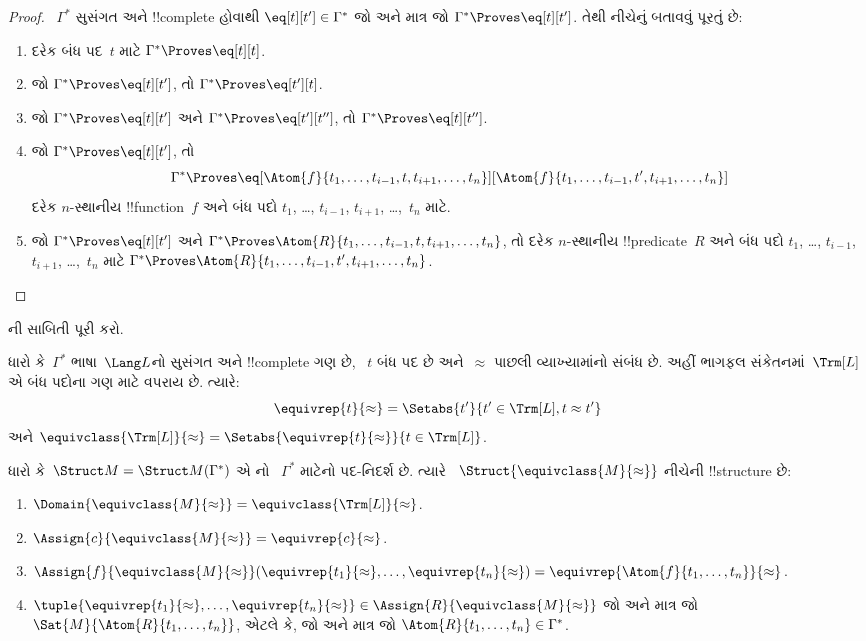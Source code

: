 \documentclass[../../../include/open-logic-section]{subfiles}
\begin{document}
\begin{proof}
~$\Gamma^*$ સુસંગત અને !!{complete} હોવાથી $\eq[t][t']\in\Gamma^*$ જો
અને માત્ર જો $\Gamma^*\Proves\eq[t][t']$. તેથી નીચેનું બતાવવું પૂરતું
છે:
\begin{enumerate}
\item દરેક બંધ પદ~$t$ માટે $\Gamma^*\Proves\eq[t][t]$.
\item જો $\Gamma^*\Proves\eq[t][t']$, તો $\Gamma^*\Proves\eq[t'][t]$.
\item જો $\Gamma^*\Proves\eq[t][t']$ અને $\Gamma^*\Proves
  \eq[t'][t'']$, તો $\Gamma^*\Proves\eq[t][t'']$.
\item જો $\Gamma^*\Proves\eq[t][t']$, તો
\[
\Gamma^* \Proves
\eq[\Atom{f}{t_1,\dots,t_{i-1},t,t_{i+1},\dots,t_n}][\Atom{f}{t_1,\dots,t_{i-1},t',t_{i+1},\dots,t_n}]
\]
દરેક $n$-સ્થાનીય !!{function}~$f$ અને બંધ પદો $t_1$, \dots,
$t_{i-1}$, $t_{i+1}$, \dots,~$t_n$ માટે.
\item જો $\Gamma^*\Proves\eq[t][t']$ અને
$\Gamma^*\Proves\Atom{R}{t_1,\dots,t_{i-1},t,t_{i+1},\dots,t_n}$,
તો દરેક $n$-સ્થાનીય !!{predicate}~$R$ અને બંધ પદો $t_1$, \dots,
$t_{i-1}$, $t_{i+1}$, \dots,~$t_n$ માટે
$\Gamma^*\Proves\Atom{R}{t_1,\dots,t_{i-1},t',t_{i+1},\dots,t_n}$.
\end{enumerate}
\end{proof}


\begin{prob}
ની સાબિતી પૂરી કરો.
\end{prob}

\begin{defn}
ધારો કે~$\Gamma^*$ ભાષા~$\Lang L$નો સુસંગત અને !!{complete} ગણ છે,
~$t$ બંધ પદ છે અને~$\approx$ પાછલી વ્યાખ્યામાંનો સંબંધ છે.
અહીં ભાગફલ સંકેતનમાં~$\Trm[L]$ એ બંધ પદોના ગણ માટે વપરાય છે. ત્યારે:
\[
\equivrep{t}{\approx}=\Setabs{t'}{t'\in\Trm[L],t\approx t'}
\]
અને
$\equivclass{\Trm[L]}{\approx}=\Setabs{\equivrep{t}{\approx}}{t\in\Trm[L]}$.
\end{defn}

\begin{defn}
ધારો કે~$\Struct M=\Struct M(\Gamma^*)$ એ નો
~$\Gamma^*$ માટેનો પદ-નિદર્શ છે. ત્યારે
~$\Struct{\equivclass{M}{\approx}}$ નીચેની !!{structure} છે:
\begin{enumerate}
\item $\Domain{\equivclass{M}{\approx}}=\equivclass{\Trm[L]}{\approx}$.
\item $\Assign{c}{\equivclass{M}{\approx}}=\equivrep{c}{\approx}$.
\item $\Assign{f}{\equivclass{M}{\approx}}(\equivrep{t_1}{\approx},\dots,
  \equivrep{t_n}{\approx})=\equivrep{\Atom{f}{t_1,\dots,t_n}}{\approx}$.
\item $\tuple{\equivrep{t_1}{\approx},\dots,\equivrep{t_n}{\approx}}
  \in\Assign{R}{\equivclass{M}{\approx}}$ જો અને માત્ર જો
  $\Sat{M}{\Atom{R}{t_1,\dots,t_n}}$, એટલે કે, જો અને માત્ર જો
  $\Atom{R}{t_1,\dots,t_n}\in\Gamma^*$.
\end{enumerate}
\end{defn}
\end{document}
